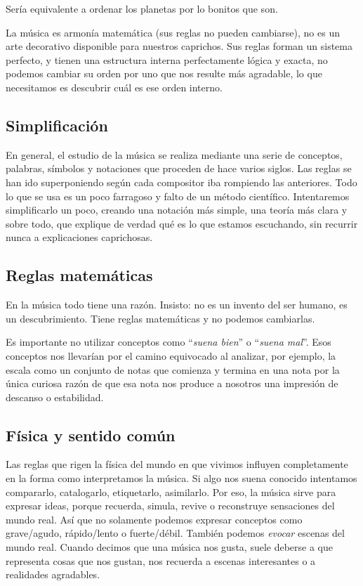 \documentclass[]{article}
\begin{document}
Sería equivalente a ordenar los planetas por lo bonitos que son.

La música es armonía matemática (sus reglas no pueden cambiarse), no es un arte decorativo disponible para nuestros caprichos. Sus reglas forman un sistema perfecto, y tienen una estructura interna perfectamente lógica y exacta, no podemos cambiar su orden por uno que nos resulte más agradable, lo que necesitamos es descubrir cuál es ese orden interno.

\subsection{Simplificación}

En general, el estudio de la música se realiza mediante una serie de conceptos, palabras, símbolos y notaciones que proceden de hace varios siglos. Las reglas se han ido superponiendo según cada compositor iba rompiendo las anteriores. Todo lo que se usa es un poco farragoso y falto de un método científico. Intentaremos simplificarlo un poco, creando una notación más simple, una teoría más clara y sobre todo, que explique de verdad qué es lo que estamos escuchando, sin recurrir nunca a explicaciones caprichosas.

\subsection{Reglas matemáticas}

En la música todo tiene una razón. Insisto: no es un invento del ser humano, es un descubrimiento. Tiene reglas matemáticas y no podemos cambiarlas.

Es importante no utilizar conceptos como ``\emph{suena   bien}'' o ``\emph{suena mal}''. Esos conceptos nos llevarían por el camino equivocado al analizar, por ejemplo, la escala como un conjunto de notas que comienza y termina en una nota por la única curiosa razón de que esa nota nos produce a nosotros una impresión de descanso o estabilidad.

\subsection{Física y sentido común}

Las reglas que rigen la física del mundo en que vivimos influyen completamente en la forma como interpretamos la música. Si algo nos suena conocido intentamos compararlo, catalogarlo, etiquetarlo, asimilarlo. Por eso, la música sirve para expresar ideas, porque recuerda, simula, revive o reconstruye sensaciones del mundo real. Así que no solamente podemos expresar conceptos como grave/agudo, rápido/lento o fuerte/débil. También podemos \emph{evocar} escenas del mundo real. Cuando decimos que una música nos gusta, suele deberse a que representa cosas que nos gustan, nos recuerda a escenas interesantes o a realidades agradables.
\end{document}
